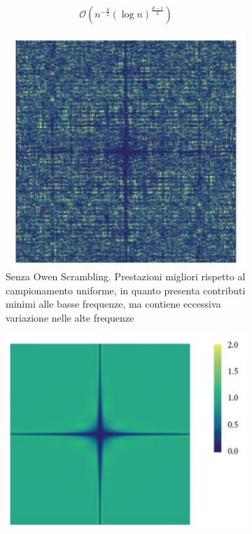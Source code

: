\begin{equation}
	\mathcal{O}\left(n^{-\frac{3}{2}}(\log n)^{\frac{d-1}{2}}\right)
\end{equation}
\begin{figure}[tb]
	\centering
	\begin{subfigure}[t]{0.4\linewidth}
		\includegraphics[width=\linewidth]{../assets/chapter5_sampling_haltonPSD.png}
		\caption{Senza Owen Scrambling. Prestazioni migliori rispetto al campionamento uniforme, in quanto presenta contributi minimi alle basse 
			frequenze, ma contiene eccessiva variazione nelle alte frequenze}
		\label{chapter5:sampling:owen:no}
	\end{subfigure}
	\begin{subfigure}[t]{0.5\linewidth}
		\includegraphics[width=\linewidth]{../assets/chapter5_sampling_owenPSD.png}

\end{subfigure}
\end{figure}
